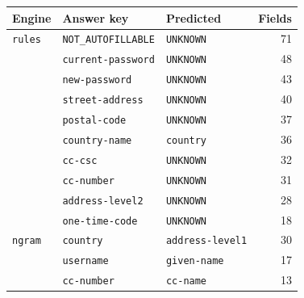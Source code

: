 \begingroup\small\setlength{\tabcolsep}{4pt}
\begin{tabular}{lllr}
\toprule
\textbf{Engine} & \textbf{Answer key} & \textbf{Predicted} & \textbf{Fields} \\
\midrule
\texttt{rules} & \texttt{NOT\_AUTOFILLABLE} & \texttt{UNKNOWN} & 71 \\  %
 & \texttt{current-password} & \texttt{UNKNOWN} & 48 \\  %
 & \texttt{new-password} & \texttt{UNKNOWN} & 43 \\  %
 & \texttt{street-address} & \texttt{UNKNOWN} & 40 \\  %
 & \texttt{postal-code} & \texttt{UNKNOWN} & 37 \\  %
 & \texttt{country-name} & \texttt{country} & 36 \\  %
 & \texttt{cc-csc} & \texttt{UNKNOWN} & 32 \\  %
 & \texttt{cc-number} & \texttt{UNKNOWN} & 31 \\  %
 & \texttt{address-level2} & \texttt{UNKNOWN} & 28 \\  %
 & \texttt{one-time-code} & \texttt{UNKNOWN} & 18 \\  %
\midrule
\texttt{ngram} & \texttt{country} & \texttt{address-level1} & 30 \\  %
 & \texttt{username} & \texttt{given-name} & 17 \\  %
 & \texttt{cc-number} & \texttt{cc-name} & 13 \\  %

\end{tabular}
